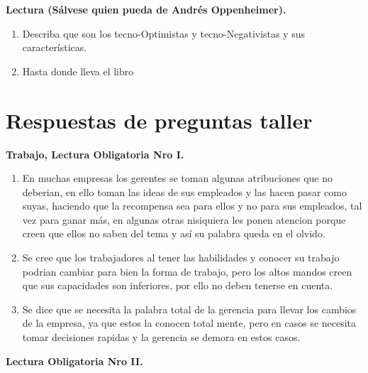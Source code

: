 \documentclass{article}
\begin{document}
\begin{multicols}{2}
 
\textbf{Lectura (Sálvese quien pueda de Andrés Oppenheimer).}
\begin{enumerate}
\item Describa que son los tecno-Optimistas y tecno-Negativistas y sus características.
\item  Hasta donde lleva el libro
\end{enumerate}

\section{Respuestas de preguntas taller}

\textbf{Trabajo, Lectura Obligatoria Nro I.}

\begin{enumerate}
\item En muchas empresas los gerentes se toman algunas atribuciones que no deberian, en ello toman las ideas de sus empleados y las hacen pasar como suyas, haciendo que la recompensa sea para ellos y no para sus empleados, tal vez para ganar más, en algunas otras nisiquiera les ponen atencion porque creen que ellos no saben del tema y así su palabra queda en el olvido.
\item  Se cree que los trabajadores al tener las habilidades y conocer su trabajo podrian cambiar para bien la forma de trabajo, pero los altos mandos creen que sus capacidades son inferiores, por ello no deben tenerse en cuenta.
\item  Se dice que se necesita la palabra total de la gerencia para llevar los cambios de la empresa, ya que estos la conocen total mente, pero en casos se necesita tomar decisiones rapidas y la gerencia se demora en estos casos.
\end{enumerate}

\textbf{Lectura Obligatoria Nro II.}
 

\end{multicols}
\end{document}
